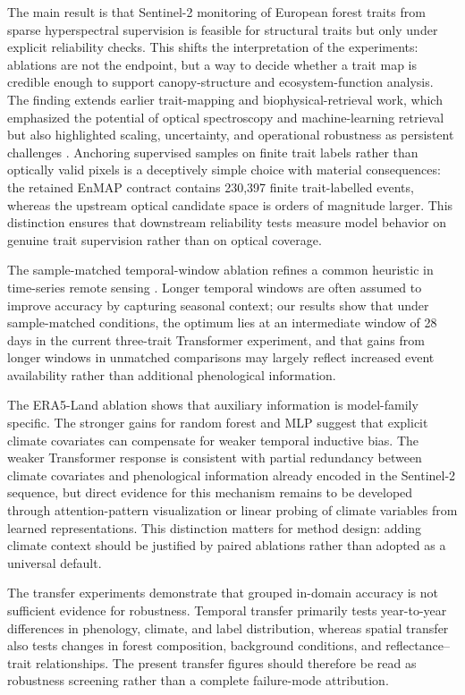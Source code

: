 \documentclass[final,times,onecolumn, authoryear]{elsarticle}
\begin{document}
\begin{linenumbers}
The main result is that Sentinel-2 monitoring of European forest traits from sparse hyperspectral supervision is feasible for structural traits but only under explicit reliability checks. This shifts the interpretation of the experiments: ablations are not the endpoint, but a way to decide whether a trait map is credible enough to support canopy-structure and ecosystem-function analysis. The finding extends earlier trait-mapping and biophysical-retrieval work, which emphasized the potential of optical spectroscopy and machine-learning retrieval but also highlighted scaling, uncertainty, and operational robustness as persistent challenges \citep{homolova2013review, verrelst2015review}. Anchoring supervised samples on finite trait labels rather than optically valid pixels is a deceptively simple choice with material consequences: the retained EnMAP contract contains 230,397 finite trait-labelled events, whereas the upstream optical candidate space is orders of magnitude larger. This distinction ensures that downstream reliability tests measure model behavior on genuine trait supervision rather than on optical coverage.

The sample-matched temporal-window ablation refines a common heuristic in time-series remote sensing \citep{russwurm2018multi, tian2021phenology}. Longer temporal windows are often assumed to improve accuracy by capturing seasonal context; our results show that under sample-matched conditions, the optimum lies at an intermediate window of 28 days in the current three-trait Transformer experiment, and that gains from longer windows in unmatched comparisons may largely reflect increased event availability rather than additional phenological information.

The ERA5-Land ablation shows that auxiliary information is model-family specific. The stronger gains for random forest and MLP suggest that explicit climate covariates can compensate for weaker temporal inductive bias. The weaker Transformer response is consistent with partial redundancy between climate covariates and phenological information already encoded in the Sentinel-2 sequence, but direct evidence for this mechanism remains to be developed through attention-pattern visualization or linear probing of climate variables from learned representations. This distinction matters for method design: adding climate context should be justified by paired ablations rather than adopted as a universal default.

The transfer experiments demonstrate that grouped in-domain accuracy is not sufficient evidence for robustness. Temporal transfer primarily tests year-to-year differences in phenology, climate, and label distribution, whereas spatial transfer also tests changes in forest composition, background conditions, and reflectance--trait relationships. The present transfer figures should therefore be read as robustness screening rather than a complete failure-mode attribution.


\end{linenumbers}
\end{document}
